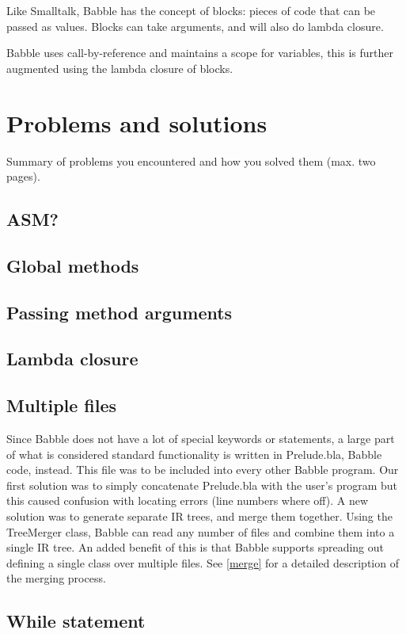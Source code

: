 \documentclass[a4paper]{article}
\begin{document}
Like Smalltalk, Babble has the concept of blocks: pieces of code that can be passed as values.
Blocks can take arguments, and will also do lambda closure.

Babble uses call-by-reference and maintains a scope for variables, this is further augmented using the lambda closure of blocks.

\section{Problems and solutions}
Summary of problems you encountered and how you solved them (max. two
pages).
\subsection{ASM?}
\subsection{Global methods}
\subsection{Passing method arguments}
\subsection{Lambda closure}
\subsection{Multiple files}

Since Babble does not have a lot of special keywords or statements, a large part of what is considered standard functionality is written in Prelude.bla, Babble code, instead. This file was to be included into every other Babble program. Our first solution was to simply concatenate Prelude.bla with the user's program but this caused confusion with locating errors (line numbers where off). A new solution was to generate separate IR trees, and merge them together. Using the TreeMerger class, Babble can read any number of files and combine them into a single IR tree. An added benefit of this is that Babble supports spreading out defining a single class over multiple files. See \ref{merge} for a detailed description of the merging process.

\subsection{While statement}
\end{document}

